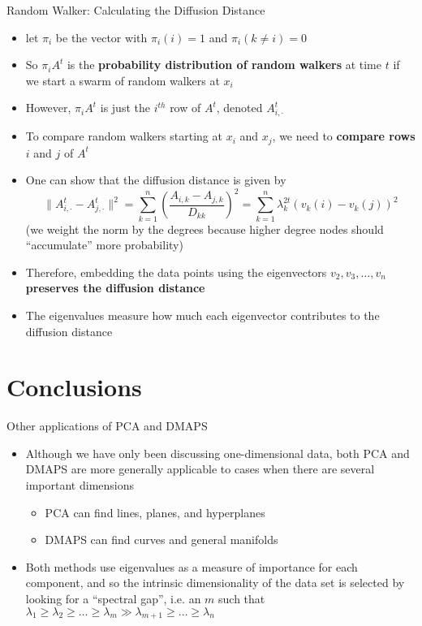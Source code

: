 \documentclass{beamer}
\begin{document}
\begin{frame}{Random Walker: Calculating the Diffusion Distance}
\begin{itemize}
\item let $\pi_i$ be the vector with $\pi_i(i) = 1$ and $\pi_i(k \ne i) = 0$
\item So $\pi_i A^t$ is the {\bf probability distribution of random walkers} at time $t$ if we start a swarm of random walkers at $x_i$
\item However, $\pi_i A^t$ is just the $i^{th}$ row of $A^t$, denoted $A_{i,\cdot}^t$
\item To compare random walkers starting at $x_i$ and $x_j$, we need to {\bf compare rows} $i$ and $j$ of $A^t$
\item One can show that the diffusion distance is given by
$$ \| A_{i,\cdot}^t - A_{j,\cdot}^t \|^2 =\sum_{k=1}^{n} \left( \frac{A_{i,k} - A_{j,k}}{D_{kk}} \right)^2 =  \sum_{k=1}^{n} \lambda_k^{2t} \left( v_k(i) - v_k(j) \right)^2 $$
(we weight the norm by the degrees because higher degree nodes should ``accumulate'' more probability)
\item Therefore, embedding the data points using the eigenvectors $v_2, v_3, \dots, v_n$ {\bf preserves the diffusion distance }
\item The eigenvalues measure how much each eigenvector contributes to the diffusion distance
\end{itemize}
\end{frame}

\section{Conclusions}
\begin{frame}{Other applications of PCA and DMAPS}
\begin{itemize}
\item Although we have only been discussing one-dimensional data, both PCA and DMAPS are more generally applicable to cases when there are several important dimensions
\begin{itemize}
\item PCA can find lines, planes, and hyperplanes
\item DMAPS can find curves and general manifolds
\end{itemize}
\item Both methods use eigenvalues as a measure of importance for each component, and so the intrinsic dimensionality of the data set is selected by looking for a ``spectral gap'', i.e. an $m$ such that $\lambda_1 \ge \lambda_2 \ge \dots \ge \lambda_m \gg \lambda_{m+1} \ge \dots \ge \lambda_n$
\end{itemize}
\end{frame}
\end{document}
